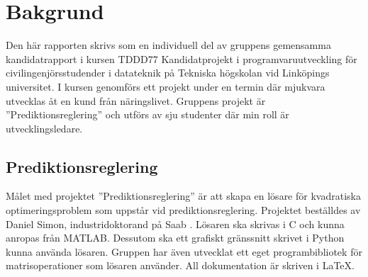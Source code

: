\section{Bakgrund}
Den här rapporten skrivs som en individuell del av gruppens  gemensamma kandidatrapport i kursen TDDD77 Kandidatprojekt i programvaruutveckling för civilingenjörsstudender i datateknik på Tekniska högskolan vid Linköpings universitet. I kursen genomförs ett projekt under en termin där mjukvara utvecklas åt en kund från näringslivet. Gruppens projekt är ''Prediktionsreglering'' och utförs av sju studenter där min roll är utvecklingsledare. 

\subsection{Prediktionsreglering}
Målet med projektet ''Prediktionsreglering'' är att skapa en lösare för kvadratiska optimeringsproblem som uppstår vid prediktionsreglering. Projektet beställdes av Daniel Simon, industridoktorand på Saab . Lösaren ska skrivas i C och kunna anropas från MATLAB. Dessutom ska ett grafiskt gränssnitt skrivet i Python kunna använda lösaren. Gruppen har även utvecklat ett eget programbibliotek för matrisoperationer som lösaren använder. All dokumentation är skriven i \LaTeX. \\
